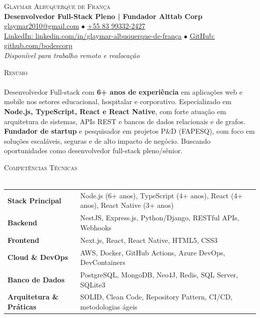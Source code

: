 \documentclass[a4paper]{article}
\newcommand{\lineunder}{
    \vspace*{-8pt} \\
    \hspace*{-18pt} \hrulefill \\
}
\newcommand{\header}[1]{
    {\hspace*{-18pt}\vspace*{6pt} \textsc{#1}}
    \vspace*{-6pt} \lineunder
}
\newcommand{\skillrow}[2]{
    \textbf{#1} & #2 \\
}
\begin{document}
\vspace*{-40pt}

%
%
\begin{center}
    {\Huge \scshape {Glaymar Albuquerque de França}}\\
    \vspace*{3pt}
    {\large \textbf{Desenvolvedor Full-Stack Pleno | Fundador Alttab Corp}}\\
    \vspace*{3pt}
    \href{mailto:glaymar2010@gmail.com}{glaymar2010@gmail.com} $\bullet$ \href{https://wa.me/+5583993322427}{+55 83 99332-2427} \\
    \vspace*{2pt}
    \href{https://www.linkedin.com/in/glaymar-albuquerque-de-fran\%C3\%A7a/}{LinkedIn: linkedin.com/in/glaymar-albuquerque-de-frança} $\bullet$ \href{https://github.com/bodescorp}{GitHub: github.com/bodescorp}\\
    \vspace*{3pt}
    \textit{Disponível para trabalho remoto e realocação} \\
\end{center}

%
%
\header{Resumo}
\vspace{2mm}
Desenvolvedor Full-stack com \textbf{6+ anos de experiência} em aplicações web e mobile nos setores educacional, hospitalar e corporativo. Especializado em \textbf{Node.js, TypeScript, React e React Native}, com forte atuação em arquitetura de sistemas, APIs REST e bancos de dados relacionais e de grafos. \textbf{Fundador de startup} e pesquisador em projetos P\&D (FAPESQ), com foco em soluções escaláveis, seguras e de alto impacto de negócio. Buscando oportunidades como desenvolvedor full-stack pleno/sênior.
\vspace{2mm}

%
%
\header{Competências Técnicas}
\vspace{2mm}
\begin{longtable}{p{3.5cm}p{12.5cm}}
    \skillrow{Stack Principal}{Node.js (6+ anos), TypeScript (4+ anos), React (4+ anos), React Native (3+ anos)}
    \skillrow{Backend}{NestJS, Express.js, Python/Django, RESTful APIs, Webhooks}
    \skillrow{Frontend}{Next.js, React, React Native, HTML5, CSS3}
    \skillrow{Cloud \& DevOps}{AWS, Docker, GitHub Actions, Azure DevOps, DevContainers}
    \skillrow{Banco de Dados}{PostgreSQL, MongoDB, Neo4J, Redis, SQL Server, SQLite3}
    \skillrow{Arquitetura \& Práticas}{SOLID, Clean Code, Repository Pattern, CI/CD, metodologias ágeis}
\end{longtable}
\vspace{2mm}
\end{document}
